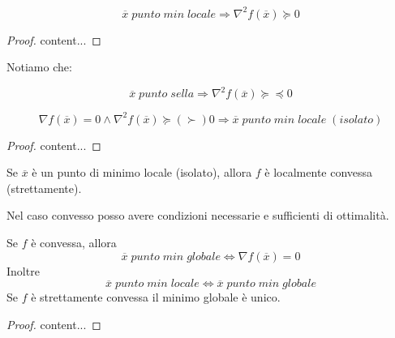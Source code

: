 \begin{theorem}
	\label{thm:optimality-condition-necessary-2}
	\begin{equation}
	\label{eqn:optimality-condition-necessary-2}
	\overline{x}\;punto\;min\;locale
	\Rightarrow
	\nabla^{2} f(\overline{x}) \succeq 0
	\end{equation}
	\begin{proof}
		content...
	\end{proof}
\end{theorem}

Notiamo che:

\begin{equation}
	\overline{x}\;punto\;sella
	\Rightarrow
	\nabla^{2} f(\overline{x}) \succeq\preceq 0
\end{equation}

\begin{theorem}
	\label{thm:optimality-condition-sufficient-2}
	\begin{equation}
	\label{eqn:optimality-condition-sufficient-2}
	\nabla f(\overline{x}) = 0 \wedge \nabla^{2} f(\overline{x}) \succeq (\succ) 0 \Rightarrow
	\overline{x}\;punto\;min\;locale\;(isolato)
	\end{equation}
	\begin{proof}
		content...
	\end{proof}
\end{theorem}

Se $\overline{x}$ è un punto di minimo locale (isolato), allora $f$ è localmente convessa (strettamente).

Nel caso convesso posso avere condizioni necessarie e sufficienti di ottimalità.

\begin{theorem}
	\label{thm:optimality-convex-ns}
	Se $f$ è convessa, allora
	\begin{equation}
	\label{eqn:optimality-convex-ns}
	\overline{x}\;punto\;min\;globale
	\Leftrightarrow
	\nabla f(\overline{x}) = 0
	\end{equation}
	Inoltre
	\begin{equation}
	\label{eqn:optimality-convex-ns-2}
	\overline{x}\;punto\;min\;locale
	\Leftrightarrow
	\overline{x}\;punto\;min\;globale
	\end{equation}
	Se $f$ è strettamente convessa il minimo globale è unico.
	\begin{proof}
		content...
	\end{proof}
\end{theorem}

